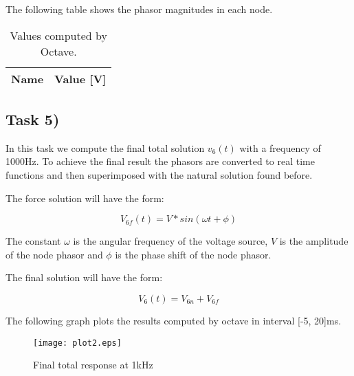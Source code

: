 The following table shows the phasor magnitudes in each node.

\begin{table}[ht]
	\centering
	\begin{tabular}{|l|r|}
    		\hline    
    		{\bf Name} & {\bf Value [V]} \\ \hline
    		
  	\end{tabular}
  	\caption{Values computed by Octave.}
 
\label{tab:node}
\end{table}


\subsection{Task 5)}
\label{subsec:task5_a}

In this task we compute the final total solution $v_6(t)$ with a frequency of 1000Hz. To achieve the final result the phasors are converted to real time functions and then superimposed with the natural solution found before.

The force solution will have the form:

\[
V_{6f}(t) = V*sin(\omega t + \phi)
\]

The constant $\omega$ is the angular frequency of the voltage source, $V$ is the amplitude of the node phasor and $\phi$ is the phase shift of the node phasor.

The final solution will have the form:

\[
V_6(t) = V_{6n} + V_{6f}
\]

The following graph plots the results computed by octave in interval [-5, 20]ms.

\begin{figure}[ht]
	\centering
	\texttt{[image: plot2.eps]}
	\caption{Final total response at 1kHz}
\label{fig:Dsnh_sim_t2}
\end{figure}

